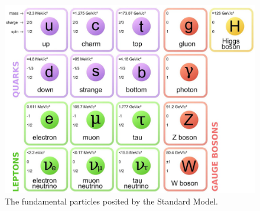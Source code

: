 \begin{figure}[ht]
  \centering
  \includegraphics[width=.65\textwidth]{figures/standard-model.jpg}
  \caption{The fundamental particles posited by the Standard Model.}
  \label{fig:standard-model}
\end{figure}
